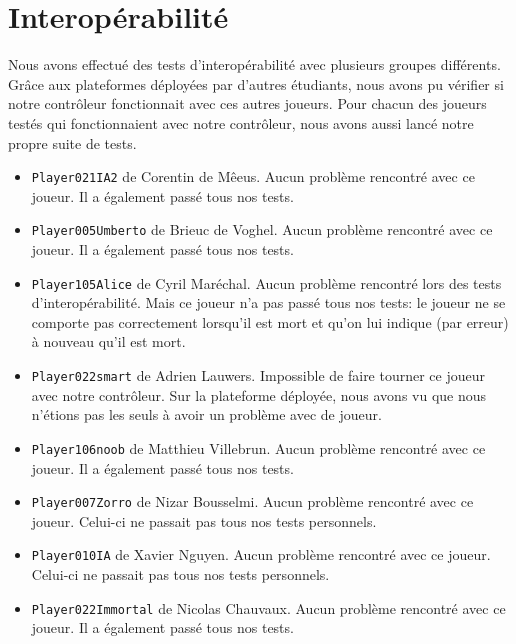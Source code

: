 \documentclass{article}
\begin{document}
\section{Interopérabilité}
Nous avons effectué des tests d'interopérabilité avec plusieurs groupes différents. Grâce aux plateformes déployées par d'autres étudiants, nous avons pu vérifier si notre contrôleur fonctionnait avec ces autres joueurs. Pour chacun des joueurs testés qui fonctionnaient avec notre contrôleur, nous avons aussi lancé notre propre suite de tests.
\begin{itemize}
	\item \texttt{Player021IA2} de Corentin de Mêeus. Aucun problème rencontré avec ce joueur. Il a également passé tous nos tests.
	\item \texttt{Player005Umberto} de Brieuc de Voghel. Aucun problème rencontré avec ce joueur. Il a également passé tous nos tests.
	\item \texttt{Player105Alice} de Cyril Maréchal. Aucun problème rencontré lors des tests d'interopérabilité. Mais ce joueur n'a pas passé tous nos tests: le joueur ne se comporte pas correctement lorsqu'il est mort et qu'on lui indique (par erreur) à nouveau qu'il est mort.
	\item \texttt{Player022smart} de Adrien Lauwers. Impossible de faire tourner ce joueur avec notre contrôleur. Sur la plateforme déployée, nous avons vu que nous n'étions pas les seuls à avoir un problème avec de joueur.
	\item \texttt{Player106noob} de Matthieu Villebrun. Aucun problème rencontré avec ce joueur. Il a également passé tous nos tests.
	\item \texttt{Player007Zorro} de Nizar Bousselmi. Aucun problème rencontré avec ce joueur. Celui-ci ne passait pas tous nos tests personnels.
	\item \texttt{Player010IA} de Xavier Nguyen. Aucun problème rencontré avec ce joueur. Celui-ci ne passait pas tous nos tests personnels.
	\item \texttt{Player022Immortal} de Nicolas Chauvaux. Aucun problème rencontré avec ce joueur. Il a également passé tous nos tests.
\end{itemize}
\end{document}
